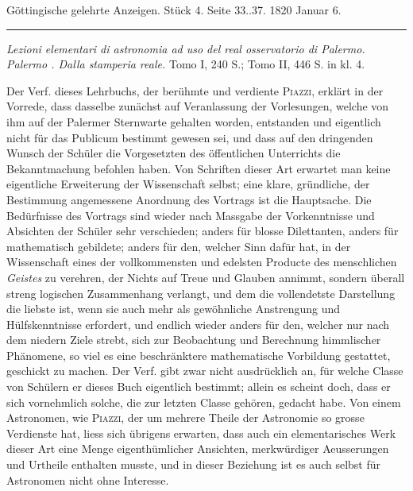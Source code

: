 \clearpage
{}
\hypertarget{native-622-lower}{}
\begin{center}\small Göttingische gelehrte Anzeigen. Stück 4. Seite 33..37. 1820 Januar 6.\\[3pt]\rule{.72\linewidth}{.3pt}\end{center}

\noindent\emph{Lezioni elementari di astronomia ad uso del real osservatorio di Palermo. Palermo {}. Dalla stamperia reale.} Tomo I, 240 S.; Tomo II, 446 S. in kl. 4.

Der Verf. dieses Lehrbuchs, der berühmte und verdiente \textsc{Piazzi}, erklärt in der Vorrede, dass dasselbe zunächst auf Veranlassung der Vorlesungen, welche von ihm auf der Palermer Sternwarte gehalten worden, entstanden und eigentlich nicht für das Publicum bestimmt gewesen sei, und dass auf den dringenden Wunsch der Schüler die Vorgesetzten des öffentlichen Unterrichts die Bekanntmachung befohlen haben. Von Schriften dieser Art erwartet man keine eigentliche Erweiterung der Wissenschaft selbst; eine klare, gründliche, der Bestimmung angemessene Anordnung des Vortrags ist die Hauptsache. Die Bedürfnisse des Vortrags sind wieder nach Massgabe der Vorkenntnisse und Absichten der Schüler sehr verschieden; anders für blosse Dilettanten, anders für mathematisch gebildete; anders für den, welcher Sinn dafür hat, in der Wissenschaft eines der vollkommensten und edelsten Producte des menschlichen \emph{Geistes} zu verehren, der Nichts auf Treue und Glauben annimmt, sondern überall streng logischen Zusammenhang verlangt, und dem die vollendetste Darstellung die liebste ist, wenn sie auch mehr als gewöhnliche Anstrengung und Hülfskenntnisse erfordert, und endlich wieder anders für den, welcher nur nach dem niedern Ziele strebt, sich zur Beobachtung und Berechnung himmlischer Phänomene, so viel es eine beschränktere mathematische Vorbildung gestattet, geschickt zu machen. Der Verf. gibt zwar nicht ausdrücklich an, für welche Classe von Schülern er dieses Buch eigentlich bestimmt; allein es scheint doch, dass er sich vornehmlich solche, die zur letzten Classe gehören, gedacht habe. Von einem Astronomen, wie \textsc{Piazzi}, der um mehrere Theile der Astronomie so grosse Verdienste hat, liess sich übrigens erwarten, dass auch ein elementarisches Werk dieser Art eine Menge eigenthümlicher Ansichten, merkwürdiger Aeusserungen und Urtheile enthalten musste, und in dieser Beziehung ist es auch selbst für Astronomen nicht ohne Interesse.

